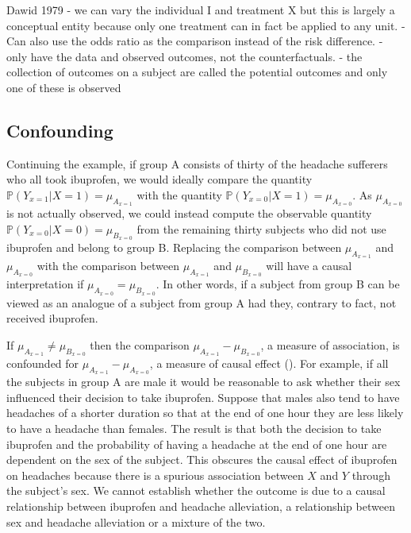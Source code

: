 \documentclass[11pt]{article}
\begin{document}
Dawid 1979 - we can vary the individual I and treatment X but this is
largely a conceptual entity because only one treatment can in fact be
applied to any unit. - Can also use the odds ratio as the comparison
instead of the risk difference. - only have the data and observed
outcomes, not the counterfactuals. - the collection of outcomes on a
subject are called the potential outcomes and only one of these is
observed

    \subsection{Confounding}\label{confounding}

Continuing the example, if group A consists of thirty of the headache
sufferers who all took ibuprofen, we would ideally compare the quantity
\(\mathbb{P}(Y_{x = 1}|X = 1) = \mu_{A_{x = 1}}\) with the quantity
\(\mathbb{P}(Y_{x = 0}|X = 1) = \mu_{A_{x = 0}}\). As
\(\mu_{A_{x = 0}}\) is not actually observed, we could instead compute
the observable quantity \(\mathbb{P}(Y_{x = 0}|X = 0) = \mu_{B_{x=0}}\)
from the remaining thirty subjects who did not use ibuprofen and belong
to group B. Replacing the comparison between \(\mu_{A_{x = 1}}\) and
\(\mu_{A_{x = 0}}\) with the comparison between \(\mu_{A_{x = 1}}\) and
\(\mu_{B_{x=0}}\) will have a causal interpretation if
\(\mu_{A_{x = 0}} = \mu_{B_{x=0}}\). In other words, if a subject from
group B can be viewed as an analogue of a subject from group A had they,
contrary to fact, not received ibuprofen. \linebreak

If \(\mu_{A_{x = 1}} \neq \mu_{B_{x=0}}\) then the comparison
\(\mu_{A_{x = 1}} - \mu_{B_{x=0}}\), a measure of association, is
confounded for \(\mu_{A_{x = 1}} - \mu_{A_{x = 0}}\), a measure of
causal effect (\citet{Greenland1999}). For example, if all the subjects
in group A are male it would be reasonable to ask whether their sex
influenced their decision to take ibuprofen. Suppose that males also
tend to have headaches of a shorter duration so that at the end of one
hour they are less likely to have a headache than females. The result is
that both the decision to take ibuprofen and the probability of having a
headache at the end of one hour are dependent on the sex of the subject.
This obscures the causal effect of ibuprofen on headaches because there
is a spurious association between \(X\) and \(Y\) through the subject's
sex. We cannot establish whether the outcome is due to a causal
relationship between ibuprofen and headache alleviation, a relationship
between sex and headache alleviation or a mixture of the two. \linebreak
\end{document}

